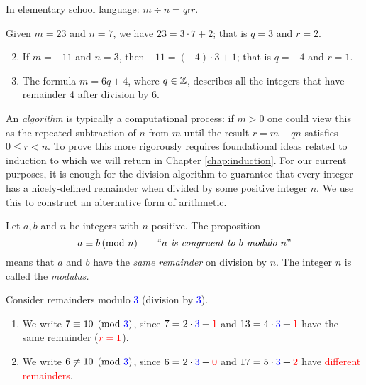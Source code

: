 In elementary school language: $m\div n=q\mathbin{\mathsf r}r$.%

\begin{examples}{}{}
	\exstart Given $m=23$ and $n=7$, we have $23=3\cdot 7+2$; that is $q=3$ and $r=2$.
	\begin{enumerate}\setcounter{enumi}{1}
		\item If $m=-11$ and $n=3$, then $-11=(-4)\cdot 3+1$; that is $q=-4$ and $r=1$.
		\item The formula $m=6q+4$, where $q\in\mathbb{Z}$, describes all the integers that have remainder 4 after division by 6.
	\end{enumerate}
\end{examples}

An \emph{algorithm} is typically a computational process: if $m>0$ one could view this as the repeated subtraction of $n$ from $m$ until the result $r=m-qn$ satisfies $0\le r<n$. To prove this more rigorously requires foundational ideas related to induction to which we will return in Chapter \ref{chap:induction}. For our current purposes, it is enough for the division algorithm to guarantee that every integer has a nicely-defined remainder when divided by some positive integer $n$. We use this to construct an alternative form of arithmetic.


\begin{defn}{}{}
	Let $a,b$ and $n$ be integers with $n$ positive. The proposition
	\[a\equiv b\negthickspace\pmod{n}\qquad \text{``\emph{$a$ is congruent to $b$ modulo $n$}''}\]
	means that $a$ and $b$ have the \emph{same remainder} on division by $n$. The integer $n$ is called the \emph{modulus.}
\end{defn}

\begin{examples}{}{}
	Consider remainders modulo \textcolor{blue}{3} (division by \textcolor{blue}{3}).
	\begin{enumerate}\itemsep1pt
	  \item We write $7\equiv 10\pmod{\textcolor{blue}{3}}$, since $7=2\cdot \textcolor{blue}{3}+\textcolor{red}{1}$ and $13=4\cdot \textcolor{blue}{3}+\textcolor{red}{1}$ have the same remainder ($\textcolor{red}{r=1}$).
	  \item We write $6\not\equiv 10\pmod{\textcolor{blue}{3}}$, since $6=2\cdot\textcolor{blue}{3}+\textcolor{red}{0}$ and $17=5\cdot\textcolor{blue}{3}+\textcolor{red}{2}$ have \textcolor{red}{different remainders}.
	\end{enumerate}
\end{examples}

